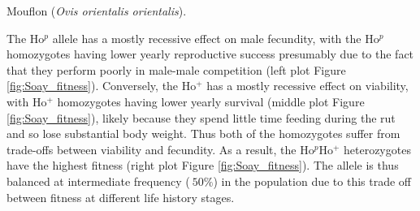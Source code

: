 \begin{marginfigure}
\begin{center}
\end{center}
\caption{Mouflon ({\it Ovis orientalis orientalis}).  } \label{fig:Soay_fitness}
\end{marginfigure} The Ho$^p$ allele has a mostly recessive effect on
male fecundity, with the Ho$^p$ homozygotes having lower yearly reproductive
success presumably due to the fact that they perform poorly in male-male
competition (left plot Figure \ref{fig:Soay_fitness}). Conversely, the
Ho$^{+}$ has a mostly recessive effect on viability, with Ho$^{+}$ homozygotes having lower
yearly survival  (middle plot Figure \ref{fig:Soay_fitness}), likely because they spend little time feeding during the rut and so lose substantial body weight. Thus both of the
homozygotes suffer from trade-offs between viability and
fecundity. As a result, the Ho$^p$Ho$^+$ heterozygotes have the highest
fitness  (right plot Figure \ref{fig:Soay_fitness}).  The allele is
thus balanced at intermediate frequency ($~50\%$) in the population due to 
this trade off between fitness at different life history stages.

